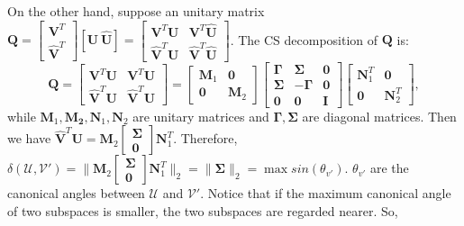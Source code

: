 \documentclass[22pt]{article}
\begin{document}
		 On the other hand, suppose an unitary matrix $\mathbf{Q} = \left[\begin{array}{c} \mathbf{V}^T \\ \mathbf{\hat{V}}^T \end{array}\right][\mathbf{U} \ \hat{\mathbf{U}}] = \left[\begin{array}{cc} \mathbf{V}^T\mathbf{U} &\mathbf{V}^T\mathbf{\hat{U}} \\ \mathbf{\hat{V}}^T\mathbf{U} & \mathbf{\hat{V}}^T\mathbf{\hat{U}}  \end{array}\right]$. The CS decomposition of $\mathbf{Q}$ is:
		 \begin{equation}
		 	\mathbf{Q} = \left[\begin{array}{cc} \mathbf{V}^T\mathbf{U} &\mathbf{V}^T\mathbf{\hat{U}} \\ \mathbf{\hat{V}}^T\mathbf{U} & \mathbf{\hat{V}}^T\mathbf{\hat{U}}  \end{array}\right] = \left[\begin{array}{cc} \mathbf{M}_1 & \mathbf{0} \\ \mathbf{0} & \mathbf{M}_2 \end{array}\right] \left[\begin{array}{ccc} \mathbf{\Gamma} & \mathbf{\Sigma}&\mathbf{0} \\ \mathbf{\Sigma} & -\mathbf{\Gamma} &\mathbf{0}\\\mathbf{0}&\mathbf{0}&\mathbf{I}\end{array}\right] \left[\begin{array}{cc} \mathbf{N}_1^T & \mathbf{0} \\ \mathbf{0} & \mathbf{N}_2^T \end{array}\right],
		 \end{equation}
		 while $\mathbf{M}_1,\mathbf{M_2},\mathbf{N}_1,\mathbf{N}_2$ are unitary matrices and $\mathbf{\Gamma},\mathbf{\Sigma}$ are diagonal matrices. Then we have $\mathbf{\hat{V}}^T\mathbf{U}=\mathbf{M}_2\left[\begin{array}{c} \mathbf{\Sigma} \\ \mathbf{0} \end{array}\right]\mathbf{N}_1^T$. Therefore, $\delta(\mathcal{U,V'}) = \|\mathbf{M}_2\left[\begin{array}{c} \mathbf{\Sigma} \\ \mathbf{0} \end{array}\right]\mathbf{N}_1^T\|_2 = \|\mathbf{\Sigma}\|_2 = \max sin(\theta_{v'})$. $\theta_{v'}$ are the canonical angles between $\mathcal{U}$ and $\mathcal{V'}$. Notice that if the maximum canonical angle of two subspaces is smaller, the two subspaces are regarded nearer. So,
\end{document}
